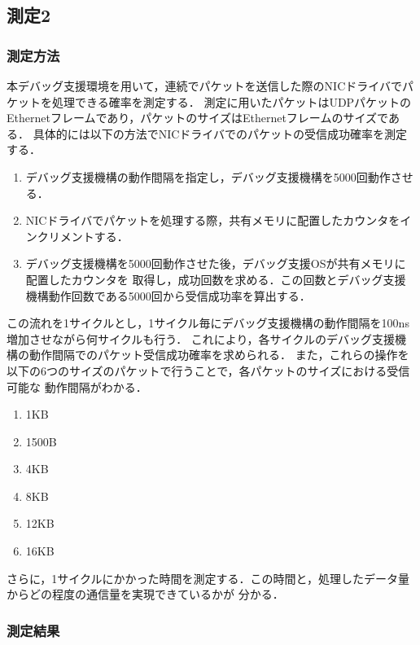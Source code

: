 \documentclass[submit,techreq,noauthor,dvipdfmx]{ipsj}
\begin{document}
\subsection{測定2}

\subsubsection{測定方法}\label{method-measure}

本デバッグ支援環境を用いて，連続でパケットを送信した際のNICドライバでパケットを処理できる確率を測定する．
測定に用いたパケットはUDPパケットのEthernetフレームであり，パケットのサイズはEthernetフレームのサイズである．
具体的には以下の方法でNICドライバでのパケットの受信成功確率を測定する．
\begin{enumerate}
    \item デバッグ支援機構の動作間隔を指定し，デバッグ支援機構を5000回動作させる．
    \item NICドライバでパケットを処理する際，共有メモリに配置したカウンタをインクリメントする．
    \item デバッグ支援機構を5000回動作させた後，デバッグ支援OSが共有メモリに配置したカウンタを
        取得し，成功回数を求める．この回数とデバッグ支援機構動作回数である5000回から受信成功率を算出する．
\end{enumerate}
この流れを1サイクルとし，1サイクル毎にデバッグ支援機構の動作間隔を100ns増加させながら何サイクルも行う．
これにより，各サイクルのデバッグ支援機構の動作間隔でのパケット受信成功確率を求められる．
また，これらの操作を以下の6つのサイズのパケットで行うことで，各パケットのサイズにおける受信可能な
動作間隔がわかる．
\begin{enumerate}
    \item 1KB
    \item 1500B
    \item 4KB
    \item 8KB
    \item 12KB
    \item 16KB
\end{enumerate}
さらに，1サイクルにかかった時間を測定する．この時間と，処理したデータ量からどの程度の通信量を実現できているかが
分かる．

\subsubsection{測定結果}\label{result-driver-limit}
\end{document}
